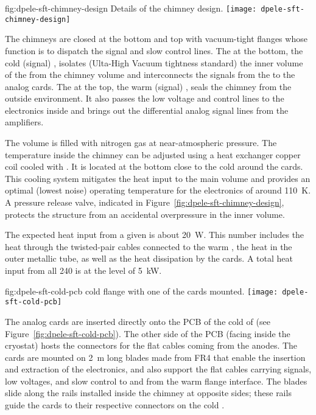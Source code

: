 \begin{dunefigure}{fig:dpele-sft-chimney-design}
{Details of the  chimney design.}
\texttt{[image: dpele-sft-chimney-design]}
\end{dunefigure}

The chimneys are closed at the bottom and top with vacuum-tight \fdth flanges whose function is to dispatch the signal and slow control lines. The \fdth at the bottom, the cold (signal) \fdth, isolates (Ulta-High Vacuum tightness standard) the inner volume of the  from the chimney volume and interconnects the signals from the  to the analog  cards. The \fdth at the top, the warm (signal) \fdth, seals the chimney from the outside environment. It also passes the low voltage and control lines to the  electronics inside and brings out the differential analog signal lines from the  amplifiers. 

The  volume is filled with nitrogen gas at near-atmospheric pressure. The temperature inside the chimney can be adjusted using a heat exchanger copper coil cooled with \lar. It is located at the bottom close to the cold \fdth around the  cards. %
This cooling system %
mitigates the heat input to the main  volume and provides an optimal (lowest noise) operating temperature for the  electronics of around \SI{110}{K}. A pressure release valve, indicated in Figure~\ref{fig:dpele-sft-chimney-design}, protects the structure from an accidental overpressure in the inner volume. 

The expected heat input from a given  is about \SI{20}{\watt}. This number includes the heat through the twisted-pair cables connected to the warm \fdth, the heat in the   outer metallic tube, as well as the heat dissipation by the  cards. A total heat input from all \num{240}  is at the level of \SI{5}{\kilo\watt}. 

\begin{dunefigure}{fig:dpele-sft-cold-pcb}
{ cold \fdth flange with one of the  cards mounted.}
\texttt{[image: dpele-sft-cold-pcb]}
\end{dunefigure}
The analog  cards are inserted directly onto the PCB of the cold \fdth of 
(see Figure~\ref{fig:dpele-sft-cold-pcb}). The other side of the PCB (facing inside the cryostat) hosts the connectors for the flat cables coming from the  anodes.  The  cards are mounted on \SI{2}{\m} long blades made from FR4 that enable the insertion and extraction of the electronics, and also support the flat cables carrying signals, low voltages, and slow control to and from the warm flange interface.  The blades slide along the rails installed inside the chimney at opposite sides; %
these rails guide the  cards to their respective connectors on the cold \fdth. 

